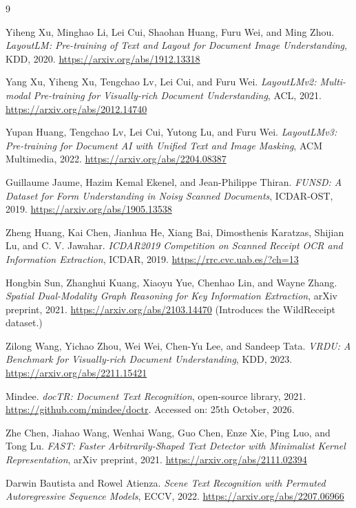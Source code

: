 \documentclass[11pt,a4paper]{article}
\begin{document}
\begin{thebibliography}{9}\small

 Yiheng Xu, Minghao Li, Lei Cui, Shaohan Huang, Furu Wei, and Ming Zhou.
\emph{LayoutLM: Pre-training of Text and Layout for Document Image Understanding}, KDD, 2020.
\url{https://arxiv.org/abs/1912.13318}

 Yang Xu, Yiheng Xu, Tengchao Lv, Lei Cui, and Furu Wei.
\emph{LayoutLMv2: Multi-modal Pre-training for Visually-rich Document Understanding}, ACL, 2021.
\url{https://arxiv.org/abs/2012.14740}

 Yupan Huang, Tengchao Lv, Lei Cui, Yutong Lu, and Furu Wei.
\emph{LayoutLMv3: Pre-training for Document AI with Unified Text and Image Masking},
ACM Multimedia, 2022. \url{https://arxiv.org/abs/2204.08387}

 Guillaume Jaume, Hazim Kemal Ekenel, and Jean-Philippe Thiran.
\emph{FUNSD: A Dataset for Form Understanding in Noisy Scanned Documents}, ICDAR-OST, 2019.
\url{https://arxiv.org/abs/1905.13538}

 Zheng Huang, Kai Chen, Jianhua He, Xiang Bai, Dimosthenis Karatzas, Shijian Lu,
and C. V. Jawahar. \emph{ICDAR2019 Competition on Scanned Receipt OCR and Information
Extraction}, ICDAR, 2019. \url{https://rrc.cvc.uab.es/?ch=13}

 Hongbin Sun, Zhanghui Kuang, Xiaoyu Yue, Chenhao Lin, and Wayne Zhang.
\emph{Spatial Dual-Modality Graph Reasoning for Key Information Extraction}, arXiv preprint,
2021. \url{https://arxiv.org/abs/2103.14470} (Introduces the WildReceipt dataset.)

 Zilong Wang, Yichao Zhou, Wei Wei, Chen-Yu Lee, and Sandeep Tata.
\emph{VRDU: A Benchmark for Visually-rich Document Understanding}, KDD, 2023.
\url{https://arxiv.org/abs/2211.15421}

 Mindee. \emph{docTR: Document Text Recognition}, open-source library, 2021.
\url{https://github.com/mindee/doctr}. Accessed on: 25th October, 2026.

 Zhe Chen, Jiahao Wang, Wenhai Wang, Guo Chen, Enze Xie, Ping Luo, and Tong Lu.
\emph{FAST: Faster Arbitrarily-Shaped Text Detector with Minimalist Kernel Representation},
arXiv preprint, 2021. \url{https://arxiv.org/abs/2111.02394}

 Darwin Bautista and Rowel Atienza.
\emph{Scene Text Recognition with Permuted Autoregressive Sequence Models}, ECCV, 2022.
\url{https://arxiv.org/abs/2207.06966}

\end{thebibliography}
\end{document}
